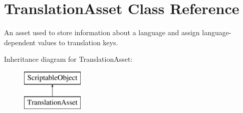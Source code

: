 \hypertarget{class_translation_asset}{}\section{Translation\+Asset Class Reference}
\label{class_translation_asset}


An asset used to store information about a language and assign language-\/dependent values to translation keys.  


Inheritance diagram for Translation\+Asset\+:\begin{figure}[H]
\begin{center}
\leavevmode
\includegraphics[height=2.000000cm]{class_translation_asset}
\end{center}
\end{figure}

